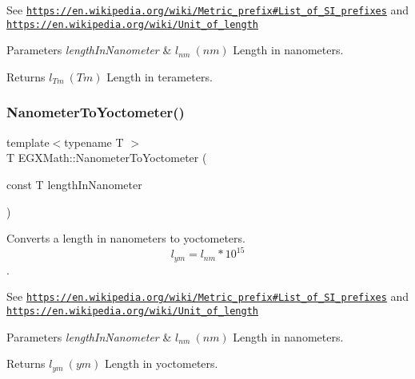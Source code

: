See \href{https://en.wikipedia.org/wiki/Metric_prefix#List_of_SI_prefixes}{\tt https\+://en.\+wikipedia.\+org/wiki/\+Metric\+\_\+prefix\#\+List\+\_\+of\+\_\+\+S\+I\+\_\+prefixes} and \href{https://en.wikipedia.org/wiki/Unit_of_length}{\tt https\+://en.\+wikipedia.\+org/wiki/\+Unit\+\_\+of\+\_\+length} 
\begin{DoxyParams}{Parameters}
{\em length\+In\+Nanometer} & $ l_{nm}\ (nm)$ Length in nanometers. \\
\hline
\end{DoxyParams}
\begin{DoxyReturn}{Returns}
$ l_{Tm}\ (Tm)$ Length in terameters. 
\end{DoxyReturn}
\mbox{\label{group___e_g_x_math-_conversions-_length_conversions-_nanometer-_s_i_gab447c3aa3d215a1030a63e28f9aca1c1}} 
\subsubsection{\texorpdfstring{Nanometer\+To\+Yoctometer()}{NanometerToYoctometer()}}
{\footnotesize\ttfamily template$<$typename T $>$ \\
T E\+G\+X\+Math\+::\+Nanometer\+To\+Yoctometer (\begin{DoxyParamCaption}\item[{const T}]{length\+In\+Nanometer }\end{DoxyParamCaption})}



Converts a length in nanometers to yoctometers. \[ l_{ym}=l_{nm} * 10^{15} \]. 

See \href{https://en.wikipedia.org/wiki/Metric_prefix#List_of_SI_prefixes}{\tt https\+://en.\+wikipedia.\+org/wiki/\+Metric\+\_\+prefix\#\+List\+\_\+of\+\_\+\+S\+I\+\_\+prefixes} and \href{https://en.wikipedia.org/wiki/Unit_of_length}{\tt https\+://en.\+wikipedia.\+org/wiki/\+Unit\+\_\+of\+\_\+length} 
\begin{DoxyParams}{Parameters}
{\em length\+In\+Nanometer} & $ l_{nm}\ (nm)$ Length in nanometers. \\
\hline
\end{DoxyParams}
\begin{DoxyReturn}{Returns}
$ l_{ym}\ (ym)$ Length in yoctometers. 
\end{DoxyReturn}
\mbox{\label{group___e_g_x_math-_conversions-_length_conversions-_nanometer-_s_i_ga986e80d7ab490fdc59ebbc2d7473bda3}} 
